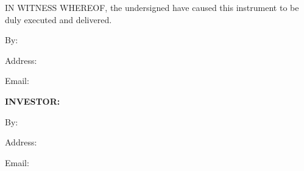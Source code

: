 IN WITNESS WHEREOF, the undersigned have caused this instrument to be duly executed and delivered.

\vspace{0.5in}

\hspace{2in}
By:

\vspace{1in}

\hspace{2.5in}
\CompanyRepName{}

\vspace{0.2in}

\hspace{2.5in}
\CompanyRepTitle{}

\vspace{0.2in}

\hspace{2.5in}
\parbox{2.5in}{
Address: \CompanyRepAddress{}
}

\vspace{0.2in}

\hspace{2.5in}
Email: \CompanyRepEmail{}

\vspace{0.5in}

\hspace{2in}
\textbf{INVESTOR:}

\vspace{0.2in}

\hspace{2in}
By:

\vspace{1in}

\hspace{2.5in}
\InvestorName{}

\vspace{0.2in}

\hspace{2.5in}
\parbox{3in}{
Address: \InvestorAddress{}
}

\vspace{0.2in}

\hspace{2.5in}
Email: \InvestorEmail{}

